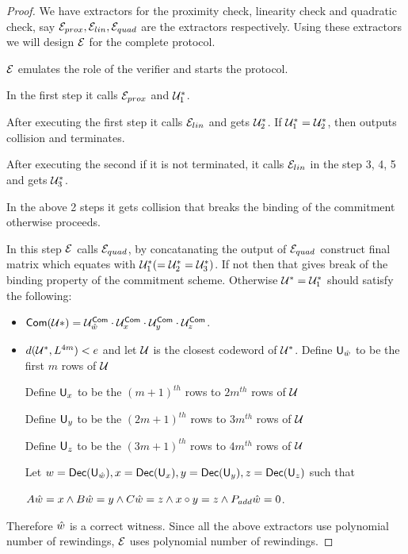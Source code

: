 \begin{proof}
	We have extractors for the proximity check, linearity check and quadratic check, say $\mathcal{E}_{prox}, \mathcal{E}_{lin}, \mathcal{E}_{quad}$ are the extractors respectively. Using these extractors we will design  $\mathcal{E}$ for the complete protocol. 
	
	$\mathcal{E}$ emulates the role of the verifier and starts the protocol. 
	
	In the first step it calls $\mathcal{E}_{prox}$ and $\mathcal{U}_1^*$.
	
	After executing the first step it calls $\mathcal{E}_{lin}$ and gets $\mathcal{U}_2^*$. If $\mathcal{U}_1^* = \mathcal{U}_2^*$, then outputs collision and terminates.
	
	After executing the second if it is not terminated, it calls $\mathcal{E}_{lin}$ in the step 3, 4, 5 and gets $\mathcal{U}_3^*$. 
	
	In the above 2 steps it gets collision that breaks the binding of the commitment otherwise proceeds.
	
	In this step $\mathcal{E}$ calls $\mathcal{E}_{quad}$, by concatanating the output of $\mathcal{E}_{quad}$ construct final matrix which equates with $\mathcal{U}_1^* (=\mathcal{U}_2^*=\mathcal{U}_3^*)$. If not then that gives break of the binding property of the commitment scheme. Otherwise $\mathcal{U}^*=\mathcal{U}_1^*$ should satisfy the following:
	\begin{itemize}
		\item $\mathsf{Com}(\mathcal{U}*)=\mathcal{U}^{\mathsf{Com}}_{\hat{w}}\cdot\mathcal{U}^{\mathsf{Com}}_x\cdot\mathcal{U}^{\mathsf{Com}}_y\cdot\mathcal{U}^{\mathsf{Com}}_z$.
		\item $d(\mathcal{U}^*,L^{4m}) < e$ and let $\mathcal{U}$ is the closest codeword of $\mathcal{U}^*$. Define $\mathsf{U}_{\hat{w}}$ to be the first $m$ rows of $\mathcal{U}$
		
		Define $\mathsf{U}_{x}$ to be the $(m+1)^{th}$ rows to $2m^{th}$ rows of $\mathcal{U}$
		
		Define $\mathsf{U}_{y}$ to be the $(2m+1)^{th}$ rows to $3m^{th}$ rows of $\mathcal{U}$
		
		Define $\mathsf{U}_{z}$ to be the $(3m+1)^{th}$ rows to $4m^{th}$ rows of $\mathcal{U}$
		
		Let $w= \mathsf{Dec}(\mathsf{U}_{\hat{w}}), x=\mathsf{Dec}(\mathsf{U}_x), y=\mathsf{Dec}(\mathsf{U}_y), z=\mathsf{Dec}(\mathsf{U}_z)$ such that
		
		$A\hat{w} = x \wedge B \hat{w} = y \wedge C \hat{w} = z \wedge x\circ y =z \wedge P_{add} \hat{w} = 0$.
	\end{itemize}
	Therefore $\hat{w}$ is a correct witness. Since all the above extractors use polynomial number of rewindings, $\mathcal{E}$ uses polynomial number of rewindings.		
\end{proof}

